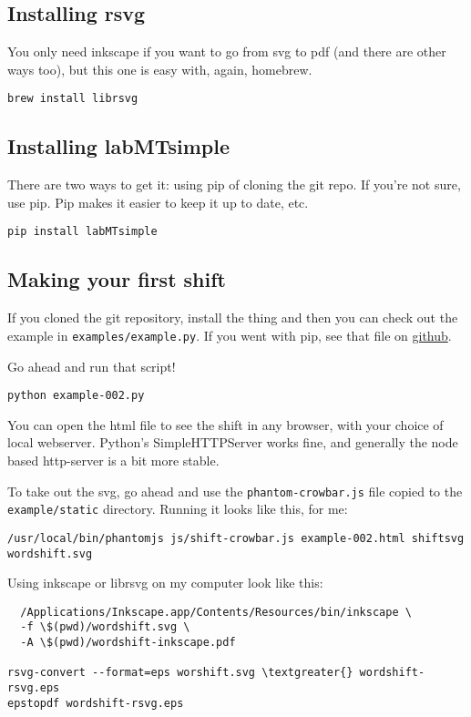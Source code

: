 \subsection{Installing rsvg}
\label{wordshifts:installing-rsvg}
You only need inkscape if you want to go from svg to pdf (and there are other ways too), but this one is easy with, again, homebrew.
\begin{lstlisting}
brew install librsvg
\end{lstlisting}


\subsection{Installing labMTsimple}
\label{wordshifts:installing-labmtsimple}
There are two ways to get it: using pip of cloning the git repo.
If you're not sure, use pip.
Pip makes it easier to keep it up to date, etc.
\begin{lstlisting}
pip install labMTsimple
\end{lstlisting}

\subsection{Making your first shift}
\label{wordshifts:making-your-first-shift}
If you cloned the git repository, install the thing and then you can check out the example in \lstinline{examples/example.py}.
If you went with pip, see that file on \href{https://github.com/andyreagan/labMT-simple/blob/master/examples/example.py}{github}.

Go ahead and run that script!
\begin{lstlisting}
python example-002.py
\end{lstlisting}

You can open the html file to see the shift in any browser, with your choice of local webserver.
Python's SimpleHTTPServer works fine, and generally the node based http-server is a bit more stable.

To take out the svg, go ahead and use the \lstinline{phantom-crowbar.js} file copied to the \lstinline{example/static} directory.
Running it looks like this, for me:
\begin{lstlisting}
/usr/local/bin/phantomjs js/shift-crowbar.js example-002.html shiftsvg wordshift.svg
\end{lstlisting}

Using inkscape or librsvg on my computer look like this:
\begin{lstlisting}
  /Applications/Inkscape.app/Contents/Resources/bin/inkscape \
  -f \$(pwd)/wordshift.svg \
  -A \$(pwd)/wordshift-inkscape.pdf

rsvg-convert --format=eps worshift.svg \textgreater{} wordshift-rsvg.eps
epstopdf wordshift-rsvg.eps
\end{lstlisting}

